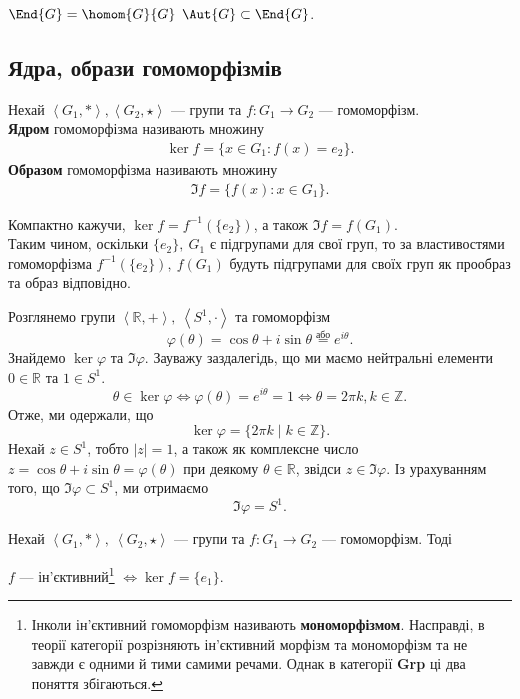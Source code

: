 \documentclass{math_library}
\begin{document}
\begin{remark}
$\End{G} = \homom{G}{G}$ \qquad $\Aut{G} \subset \End{G}$.
\end{remark}
\fi

\subsection{Ядра, образи гомоморфізмів}
\begin{definition}
Нехай $\left<G_1, * \right>,\left<G_2, \star \right>$ --- групи та $f \colon G_1 \to G_2$ --- гомоморфізм.\\
\textbf{Ядром} гомоморфізма називають множину
\begin{align*}
\ker f = \{ x \in G_1: f(x) = e_2 \}.
\end{align*}
\textbf{Образом} гомоморфізма називають множину
\begin{align*}
\Im f = \{f(x) : x \in G_1\}.
\end{align*}
\end{definition}

\begin{remark}
Компактно кажучи, $\ker f = f^{-1}(\{e_2\})$, а також $\Im f = f(G_1)$.
\bigskip \\
Таким чином, оскільки $\{e_2\},\ G_1$ є підгрупами для свої груп, то за властивостями гомоморфізма $f^{-1}(\{e_2\}),\ f(G_1)$ будуть підгрупами для своїх груп як прообраз та образ відповідно.
\end{remark}

\begin{example}
Розглянемо групи $\left<\mathbb{R},+\right>,\ \left<S^1,\cdot \right>$ та гомоморфізм 
\[
\varphi(\theta) = \cos \theta + i \sin \theta \overset{\text{або}}{=} e^{i\theta}. 
\]
Знайдемо $\ker \varphi$ та $\Im \varphi$. Зауважу заздалегідь, що ми маємо нейтральні елементи $0 \in \mathbb{R}$ та $1 \in S^1$.
\[
\theta \in \ker \varphi \iff \varphi(\theta) = e^{i \theta} = 1 \iff \theta = 2 \pi k, k \in \mathbb{Z}.
\]
Отже, ми одержали, що
\[
\ker \varphi = \{2 \pi k \mid k \in \mathbb{Z}\}.
\]
Нехай $z \in S^1$, тобто $|z| = 1$, а також як комплексне число $z = \cos \theta + i \sin \theta = \varphi(\theta)$ при деякому $\theta \in \mathbb{R}$, звідси $z \in \Im \varphi$. Із урахуванням того, що $\Im \varphi \subset S^1$, ми отримаємо
\[ 
\Im \varphi = S^1.
\]
\end{example}

\begin{theorem}
Нехай $\left<G_1, * \right>,\ \left<G_2, \star \right>$ --- групи та $f \colon G_1 \to G_2$ --- гомоморфізм. Тоді
\begin{center}
$f$ --- ін'єктивний\footnote{Інколи ін'єктивний гомоморфізм називають \textbf{мономорфізмом}. Насправді, в теорії категорії розрізняють ін'єктивний морфізм та мономорфізм та не завжди є одними й тими самими речами. Однак в категорії \textbf{Grp} ці два поняття збігаються.} $\iff \ker f = \{e_1\}$.
\end{center}
\end{theorem}
\end{document}
